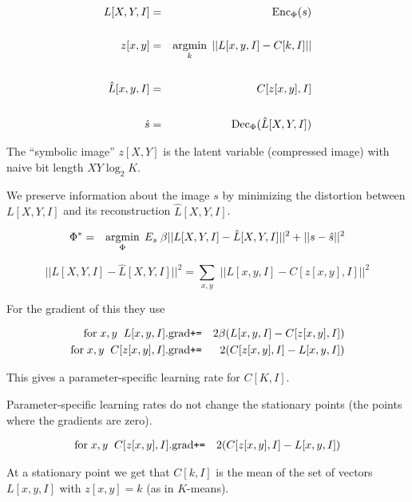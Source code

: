 {{\huge
\begin{eqnarray*}
L[X,Y,I] & = & \mathrm{Enc}_\Phi(s) \\
\\
z[x,y] & = & \operatorname*{argmin}_k \;||L[x,y,I] - C[k,I]|| \\
\\
\hat{L}[x,y,I] & = & C[z[x,y],I] \\
\\
\hat{s} & = & \mathrm{Dec}_\Phi(\hat{L}[X,Y,I])
\end{eqnarray*}
}

\vfill
The ``symbolic image'' $z[X,Y]$ is the latent variable (compressed image) with naive bit length $XY\log_2 K$.


We preserve information about the image $s$ by minimizing the distortion between $L[X,Y,I]$ and its reconstruction $\hat{L}[X,Y,I]$.

\vfill
\begin{eqnarray*}
\Phi^* & = & \operatorname*{argmin}_\Phi \;E_s\; \beta||L[X,Y,I] - \hat{L}[X,Y,I]||^2 + ||s -\hat{s}||^2
\end{eqnarray*}


$$||L[X,Y,I] - \hat{L}[X,Y,I]||^2 = \sum_{x,y}\;||L[x,y,I] - C[z[x,y],I]||^2$$

\vfill
For the gradient of this they use

\begin{eqnarray*}
\mathrm{for}\;x,y\;\;L[x,y,I].\mathrm{grad} & \mbox{\tt +=} & 2\beta({L}[x,y,I]- C[z[x,y],I]) \\
\mathrm{for}\;x,y\;\;C[z[x,y],I].\mathrm{grad} & \mbox{\tt +=} & 2(C[z[x,y],I] - L[x,y,I])
\end{eqnarray*}

\vfill
This gives a parameter-specific learning rate for $C[K,I]$.

\vfill
Parameter-specific learning rates do not change the stationary points (the points where the gradients are zero).


\begin{eqnarray*}
\mathrm{for}\;x,y\;\;C[z[x,y],I].\mathrm{grad} & \mbox{\tt +=} & 2(C[z[x,y],I] - L[x,y,I])
\end{eqnarray*}

\vfill
At a stationary point we get that $C[k,I]$ is the mean of the set of vectors $L[x,y,I]$ with $z[x,y] = k$ (as in $K$-means).

}
